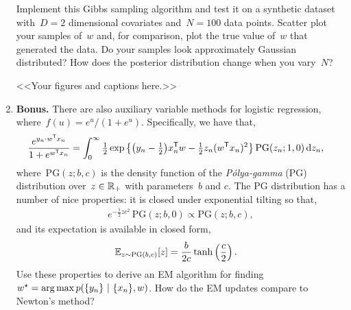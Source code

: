 \begin{enumerate}[label=(\alph*)]
Implement this Gibbs sampling algorithm and test it on a synthetic dataset with~$D=2$ dimensional covariates and~$N=100$ data points.  Scatter plot your samples of~$w$ and, for comparison, plot the true value of~$w$ that generated the data. Do your samples look approximately Gaussian distributed?  How does the posterior distribution change when you vary~$N$? 

\begin{solution}
<<Your figures and captions here.>>
\end{solution}

\item \textbf{Bonus.}  There are also auxiliary variable methods for logistic regression, where~$f(u) = e^u / (1+e^u)$.  Specifically,  we have that,
\begin{align*}
    \frac{e^{y_n \cdot w^{\mathsf{T}} x_n}}{1 + e^{w^{\mathsf{T}} x_n}} &= 
    \int_0^\infty \tfrac{1}{2} \exp \left\{ \big(y_n - \tfrac{1}{2}\big) x_n^{\mathsf{T}} w -\tfrac{1}{2} z_n (w^{\mathsf{T}} x_n)^2 \right\} \mathrm{PG}(z_n; 1, 0) \, \mathrm{d}z_n,
\end{align*}
where~$\mathrm{PG}(z; b, c)$ is the density function of the \emph{P\'{o}lya-gamma} (PG) distribution over~$z \in \mathbb{R}_+$ with parameters~$b$ and $c$.   The PG distribution has a number of nice properties: it is closed under exponential tilting so that,
\begin{align*}
    e^{-\tfrac{1}{2} z c^2} \, \mathrm{PG}(z; b, 0) \propto \mathrm{PG}(z; b, c),
\end{align*}
and its expectation is available in closed form,
\begin{align*}
    \mathbb{E}_{z \sim \mathrm{PG}(b, c)}[z] &= \frac{b}{2c} \tanh \left(\frac{c}{2} \right).
\end{align*}
Use these properties to derive an EM algorithm for finding~$w^\star = \operatorname*{arg\,max} p(\{y_n\} ~\vert~ \{x_n\}, w)$.  How do the EM updates compare to Newton's method?

\end{enumerate}

